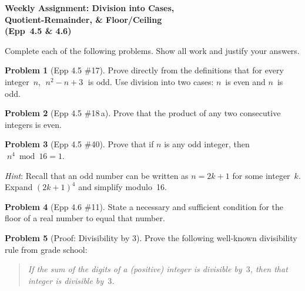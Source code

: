\documentclass[11pt]{article}
\begin{document}
\begin{center}
  {\Large\bfseries Weekly Assignment: Division into Cases,\\[2pt]
   Quotient-Remainder, \& Floor/Ceiling\\[2pt]
   (Epp~4.5 \& 4.6)}
\end{center}

\bigskip

\noindent
Complete each of the following problems.  Show all work and justify your answers.

\bigskip

\noindent\textbf{Problem 1} (Epp 4.5 \#17). \;
Prove directly from the definitions that for every integer~$n$,
$\;n^2 - n + 3\;$ is odd.  Use division into two cases: $n$~is
even and $n$~is odd.

\bigskip

\noindent\textbf{Problem 2} (Epp 4.5 \#18\,a). \;
Prove that the product of any two consecutive integers is even.

\bigskip

\noindent\textbf{Problem 3} (Epp 4.5 \#40). \;
Prove that if $n$ is any odd integer, then
$\;n^4 \bmod 16 = 1$.

\medskip\noindent
\emph{Hint}: Recall that an odd number can be written as
$n = 2k + 1$ for some integer~$k$.  Expand $(2k+1)^4$ and
simplify modulo~16.

\bigskip

\noindent\textbf{Problem 4} (Epp 4.6 \#11). \;
State a necessary and sufficient condition for the floor of a real
number to equal that number.

\bigskip

\noindent\textbf{Problem 5} (Proof: Divisibility by 3). \;
Prove the following well-known divisibility rule from grade
school:

\begin{quote}
  \emph{If the sum of the digits of a (positive) integer is
  divisible by~$3$, then that integer is divisible by~$3$.}
\end{quote}
\end{document}
